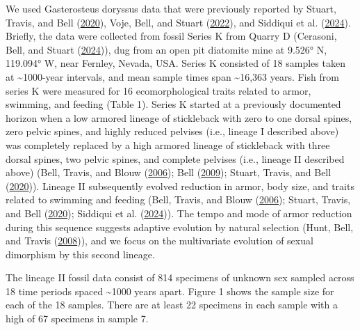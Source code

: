 \documentclass[
  12pt,
]{article}
\begin{document}
We used Gasterosteus doryssus data that were previously reported by
Stuart, Travis, and Bell (\protect\hyperlink{ref-Stuartetal2020}{2020}),
Voje, Bell, and Stuart (\protect\hyperlink{ref-Vojeetal2022}{2022}), and
Siddiqui et al. (\protect\hyperlink{ref-Siddiquietal2024}{2024}).
Briefly, the data were collected from fossil Series K from Quarry D
(Cerasoni, Bell, and Stuart
(\protect\hyperlink{ref-Cerasonietal2024}{2024})), dug from an open pit
diatomite mine at 9.526° N, 119.094° W, near Fernley, Nevada, USA.
Series K consisted of 18 samples taken at \textasciitilde1000-year
intervals, and mean sample times span \textasciitilde16,363 years. Fish
from series K were measured for 16 ecomorphological traits related to
armor, swimming, and feeding (Table 1). Series K started at a previously
documented horizon when a low armored lineage of stickleback with zero
to one dorsal spines, zero pelvic spines, and highly reduced pelvises
(i.e., lineage I described above) was completely replaced by a high
armored lineage of stickleback with three dorsal spines, two pelvic
spines, and complete pelvises (i.e., lineage II described above) (Bell,
Travis, and Blouw (\protect\hyperlink{ref-Belletal2006}{2006}); Bell
(\protect\hyperlink{ref-Bell2009}{2009}); Stuart, Travis, and Bell
(\protect\hyperlink{ref-Stuartetal2020}{2020})). Lineage II subsequently
evolved reduction in armor, body size, and traits related to swimming
and feeding (Bell, Travis, and Blouw
(\protect\hyperlink{ref-Belletal2006}{2006}); Stuart, Travis, and Bell
(\protect\hyperlink{ref-Stuartetal2020}{2020}); Siddiqui et al.
(\protect\hyperlink{ref-Siddiquietal2024}{2024})). The tempo and mode of
armor reduction during this sequence suggests adaptive evolution by
natural selection (Hunt, Bell, and Travis
(\protect\hyperlink{ref-Huntetal2008}{2008})), and we focus on the
multivariate evolution of sexual dimorphism by this second lineage.

The lineage II fossil data consist of 814 specimens of unknown sex
sampled across 18 time periods spaced \textasciitilde1000 years apart.
Figure 1 shows the sample size for each of the 18 samples. There are at
least 22 specimens in each sample with a high of 67 specimens in sample
7.
\end{document}
